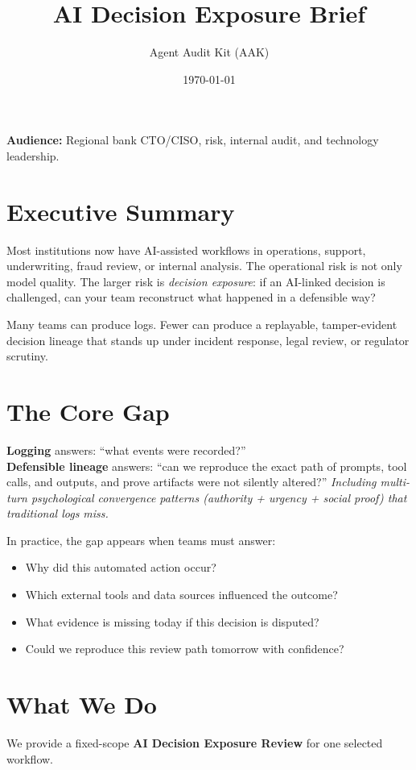 \documentclass[11pt]{article}
\title{\textbf{AI Decision Exposure Brief}}
\author{Agent Audit Kit (AAK)}
\date{\today}
\begin{document}
\maketitle

\noindent\textbf{Audience:} Regional bank CTO/CISO, risk, internal audit, and technology leadership.

\section*{Executive Summary}
Most institutions now have AI-assisted workflows in operations, support, underwriting, fraud review, or internal analysis. The operational risk is not only model quality. The larger risk is \textit{decision exposure}: if an AI-linked decision is challenged, can your team reconstruct what happened in a defensible way?

\medskip
\noindent Many teams can produce logs. Fewer can produce a replayable, tamper-evident decision lineage that stands up under incident response, legal review, or regulator scrutiny.

\section*{The Core Gap}
\textbf{Logging} answers: ``what events were recorded?''\\
\textbf{Defensible lineage} answers: ``can we reproduce the exact path of prompts, tool calls, and outputs, and prove artifacts were not silently altered?''
\newline
\textit{Including multi-turn psychological convergence patterns (authority + urgency + social proof) that traditional logs miss.}

\medskip
\noindent In practice, the gap appears when teams must answer:
\begin{itemize}
  \item Why did this automated action occur?
  \item Which external tools and data sources influenced the outcome?
  \item What evidence is missing today if this decision is disputed?
  \item Could we reproduce this review path tomorrow with confidence?
\end{itemize}

\section*{What We Do}
We provide a fixed-scope \textbf{AI Decision Exposure Review} for one selected workflow.
\end{document}
